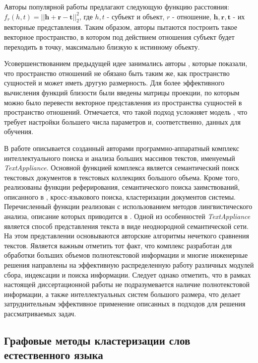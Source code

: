 Авторы популярной работы \cite{transe} предлагают следующую функцию расстояния: $f_r(h, t) = ||\mathbf{h} + \mathbf{r} - \mathbf{t}||_2^2$, где $h,t$ - субъект и объект, $r$ - отношение, $\mathbf{h},\mathbf{r},\mathbf{t}$ - их векторные представления. Таким образом, авторы пытаются построить такое векторное пространство, в котором под действием отношения субъект будет переходить в точку, максимально близкую к истинному объекту. 

Усовершенствованием предыдущей идее занимались авторы \cite{transr}, которые показали, что пространство отношений не обязано быть таким же, как пространство сущностей и может иметь другую размерность. Для более эффективного вычисления функций близости были введены матрицы проекции, по которым можно было перевести векторное представления из пространства сущностей в пространство отношений. Отмечается, что такой подход усложняет модель \cite{transe}, что требует настройки большего числа параметров и, соответственно, данных для обучения.

В работе \cite{osipov_text_appliance} описывается созданный авторами программно-аппаратный комплекс интеллектуального поиска и анализа больших массивов текстов, именуемый \emph{TextAppliance}. Основной функцией комплекса является семантический поиск текстовых документов в текстовых коллекциях большого объема. Кроме того, реализованы функции реферирования, семантического поиска заимствований, описанного в \cite{osipov_plagiarism}, кросс-языкового поиска, кластеризации документов системы. Перечисленный функции реализован с использованием методов лингвистического анализа, описание которых приводится в \cite{osipov_semantic}. Одной из особенностей \emph{TextAppliance} является способ представления текста в виде неоднородной семантической сети. На этом представлении основываются авторские алгоритмы нечеткого сравнения текстов. Является важным отметить тот факт, что комплекс разработан для обработки больших объемов полнотекстовой информации и многие инженерные решения направлены на эффективную распределенную работу различных модулей сбора, индексации и поиска информации. Следует однако отметить, что в рамках настоящей диссертационной работы не подразумевается наличие полнотекстовой информации, а также интеллектуальных систем большого размера, что делает затруднительным эффективное применение описанных в \cite{osipov_text_appliance,osipov_plagiarism,osipov_semantic} подходов для решения рассматриваемых задач.

\subsection{Графовые методы кластеризации слов естественного языка}

